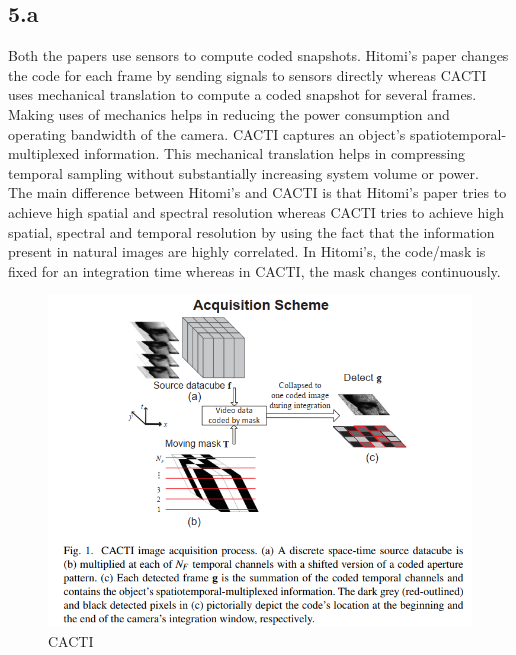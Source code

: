 \documentclass[12pt]{article}
\begin{document}
\subsection*{5.a}
Both the papers use sensors to compute coded snapshots. Hitomi's paper changes the code for each frame by sending signals to sensors directly whereas CACTI uses mechanical translation to compute a coded snapshot for several frames. Making uses of mechanics helps in reducing the power consumption and operating bandwidth of the camera. CACTI captures an object's spatiotemporal-multiplexed information. This mechanical translation helps in compressing temporal sampling without substantially increasing system volume or power. \\
The main difference between Hitomi's and CACTI is that Hitomi's paper tries to achieve  high spatial and spectral resolution whereas CACTI tries to achieve high spatial, spectral and temporal resolution by using the fact that the information present in natural images are highly correlated. In Hitomi's, the code/mask is fixed for an integration time whereas in CACTI, the mask changes continuously.
\newpage
\begin{figure}[ht]
	\centering
	\includegraphics[scale=0.75]{CACTI.png}
	\caption{CACTI}
\end{figure}
\end{document}
